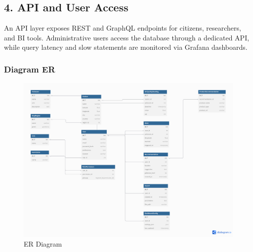 \subsection*{4. API and User Access}
An API layer exposes REST and GraphQL endpoints for citizens, researchers, and BI tools. Administrative users access the database through a dedicated API, while query latency and slow statements are monitored via Grafana dashboards.
\newpage

\subsubsection*{Diagram ER}

\begin{figure}[H]
  \centering
  \includegraphics[width=\linewidth]{Imagenes/ER_Diagram.png}
  \caption{ER Diagram}
\end{figure}

